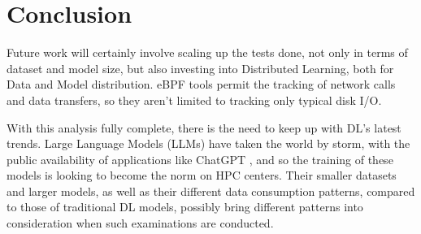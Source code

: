 \documentclass[conference]{IEEEtran}
\begin{document}

\section{Conclusion}

Future work will certainly involve scaling up the tests done, not only in terms of dataset and model size, but also investing into Distributed Learning, both for Data and Model distribution. eBPF tools permit the tracking of network calls and data transfers, so they aren't limited to tracking only typical disk I/O.

With this analysis fully complete, there is the need to keep up with DL's latest trends. Large Language Models (LLMs) have taken the world by storm, with the public availability of applications like ChatGPT \cite{chatgpt}, and so the training of these models is looking to become the norm on HPC centers. Their smaller datasets and larger models, as well as their different data consumption patterns, compared to those of traditional DL models, possibly bring different patterns into consideration when such examinations are conducted. 


\end{document}
